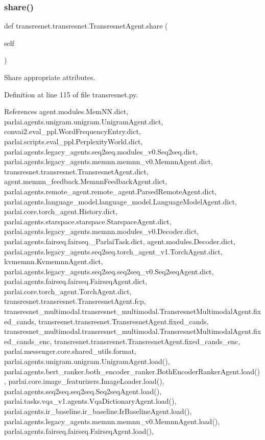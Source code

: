 \subsubsection{\texorpdfstring{share()}{share()}}
{\footnotesize\ttfamily def transresnet.\+transresnet.\+Transresnet\+Agent.\+share (\begin{DoxyParamCaption}\item[{}]{self }\end{DoxyParamCaption})}

\begin{DoxyVerb}Share appropriate attributes.\end{DoxyVerb}
 

Definition at line 115 of file transresnet.\+py.



References agent.\+modules.\+Mem\+N\+N.\+dict, parlai.\+agents.\+unigram.\+unigram.\+Unigram\+Agent.\+dict, convai2.\+eval\+\_\+ppl.\+Word\+Frequency\+Entry.\+dict, parlai.\+scripts.\+eval\+\_\+ppl.\+Perplexity\+World.\+dict, parlai.\+agents.\+legacy\+\_\+agents.\+seq2seq.\+modules\+\_\+v0.\+Seq2seq.\+dict, parlai.\+agents.\+legacy\+\_\+agents.\+memnn.\+memnn\+\_\+v0.\+Memnn\+Agent.\+dict, transresnet.\+transresnet.\+Transresnet\+Agent.\+dict, agent.\+memnn\+\_\+feedback.\+Memnn\+Feedback\+Agent.\+dict, parlai.\+agents.\+remote\+\_\+agent.\+remote\+\_\+agent.\+Parsed\+Remote\+Agent.\+dict, parlai.\+agents.\+language\+\_\+model.\+language\+\_\+model.\+Language\+Model\+Agent.\+dict, parlai.\+core.\+torch\+\_\+agent.\+History.\+dict, parlai.\+agents.\+starspace.\+starspace.\+Starspace\+Agent.\+dict, parlai.\+agents.\+legacy\+\_\+agents.\+memnn.\+modules\+\_\+v0.\+Decoder.\+dict, parlai.\+agents.\+fairseq.\+fairseq.\+\_\+\+Parlai\+Task.\+dict, agent.\+modules.\+Decoder.\+dict, parlai.\+agents.\+legacy\+\_\+agents.\+seq2seq.\+torch\+\_\+agent\+\_\+v1.\+Torch\+Agent.\+dict, kvmemnn.\+Kvmemnn\+Agent.\+dict, parlai.\+agents.\+legacy\+\_\+agents.\+seq2seq.\+seq2seq\+\_\+v0.\+Seq2seq\+Agent.\+dict, parlai.\+agents.\+fairseq.\+fairseq.\+Fairseq\+Agent.\+dict, parlai.\+core.\+torch\+\_\+agent.\+Torch\+Agent.\+dict, transresnet.\+transresnet.\+Transresnet\+Agent.\+fcp, transresnet\+\_\+multimodal.\+transresnet\+\_\+multimodal.\+Transresnet\+Multimodal\+Agent.\+fixed\+\_\+cands, transresnet.\+transresnet.\+Transresnet\+Agent.\+fixed\+\_\+cands, transresnet\+\_\+multimodal.\+transresnet\+\_\+multimodal.\+Transresnet\+Multimodal\+Agent.\+fixed\+\_\+cands\+\_\+enc, transresnet.\+transresnet.\+Transresnet\+Agent.\+fixed\+\_\+cands\+\_\+enc, parlai.\+messenger.\+core.\+shared\+\_\+utils.\+format, parlai.\+agents.\+unigram.\+unigram.\+Unigram\+Agent.\+load(), parlai.\+agents.\+bert\+\_\+ranker.\+both\+\_\+encoder\+\_\+ranker.\+Both\+Encoder\+Ranker\+Agent.\+load(), parlai.\+core.\+image\+\_\+featurizers.\+Image\+Loader.\+load(), parlai.\+agents.\+seq2seq.\+seq2seq.\+Seq2seq\+Agent.\+load(), parlai.\+tasks.\+vqa\+\_\+v1.\+agents.\+Vqa\+Dictionary\+Agent.\+load(), parlai.\+agents.\+ir\+\_\+baseline.\+ir\+\_\+baseline.\+Ir\+Baseline\+Agent.\+load(), parlai.\+agents.\+legacy\+\_\+agents.\+memnn.\+memnn\+\_\+v0.\+Memnn\+Agent.\+load(), parlai.\+agents.\+fairseq.\+fairseq.\+Fairseq\+Agent.\+load(), 